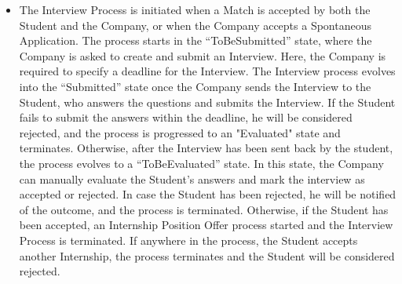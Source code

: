 \begin{itemize}
    \item The Interview Process is initiated when a Match is accepted by both the Student and the Company, or when the Company accepts a Spontaneous Application. The process starts in the “ToBeSubmitted” state, where the Company is asked to create and submit an Interview. Here, the Company is required to specify a deadline for the Interview. The Interview process evolves into the “Submitted” state once the Company sends the Interview to the Student, who answers the questions and submits the Interview. If the Student fails to submit the answers within the deadline, he will be considered rejected, and the process is progressed to an "Evaluated" state and terminates. Otherwise, after the Interview has been sent back by the student, the process evolves to a “ToBeEvaluated” state. In this state, the Company can manually evaluate the Student's answers and mark the interview as accepted or rejected. In case the Student has been rejected, he will be notified of the outcome, and the process is terminated. Otherwise, if the Student has been accepted, an Internship Position Offer process started and the Interview Process is terminated. If anywhere in the process, the Student accepts another Internship, the process terminates and the Student will be considered rejected.
\end{itemize}

